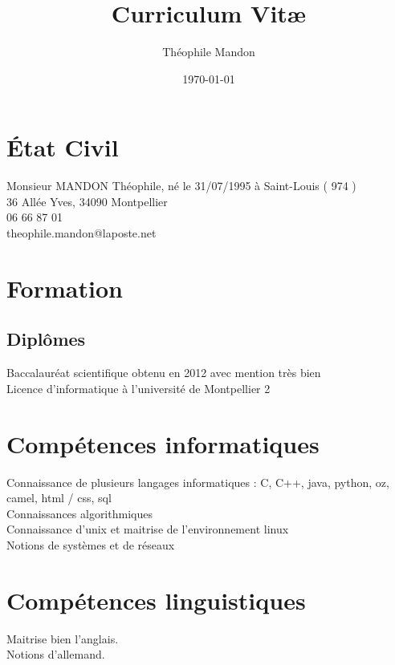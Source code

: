 \documentclass[a4paper]{article}
\title{Curriculum Vit\ae}
\author{Théophile Mandon}
\date{\today}
\begin{document}
\maketitle

\section{\'Etat Civil}
Monsieur MANDON Théophile, né le 31/07/1995 à Saint-Louis ( 974 )
\\36 Allée Yves, 34090 Montpellier
\\06 66 87 01 
\\theophile.mandon@laposte.net

\section{Formation}

\subsection{Diplômes}
Baccalauréat scientifique obtenu en 2012 avec mention très bien
\\Licence d'informatique à l'université de Montpellier 2



\section*{Compétences informatiques}
Connaissance de plusieurs langages informatiques : C, C++, java, python, oz, camel, html / css, sql
\\Connaissances algorithmiques 
\\Connaissance d'unix et maitrise de l'environnement linux
\\Notions de systèmes et de réseaux

\section*{Compétences linguistiques}
Maitrise bien l'anglais.
\\Notions d'allemand.
\end{document}
